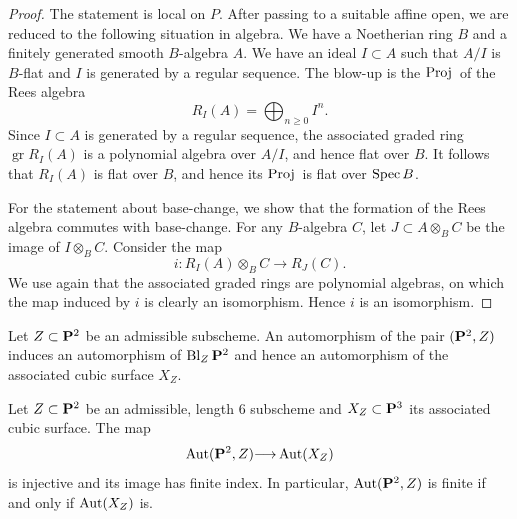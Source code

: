 \documentclass[12pt,reqno]{amsart}
\DeclareMathOperator{\Bl}{Bl}
\renewcommand{\to}{{\longrightarrow}}
\numberwithin{equation}{section}
\newcommand{\Proj}{{\text{\rm Proj}\,}}
\begin{document}
\begin{proof}
  The statement is local on $P$.
  After passing to a suitable affine open, we are reduced to the following situation in algebra.
  We have a Noetherian ring $B$ and a finitely generated smooth $B$-algebra $A$.
  We have an ideal $I \subset A$ such that $A/I$ is $B$-flat and $I$ is generated by a regular sequence.
  The blow-up is the $\Proj$ of the Rees algebra
  \[R_I(A) = \bigoplus_{n \geq 0}I^n.\]
  Since $I \subset A$ is generated by a regular sequence, the associated graded ring $\operatorname{gr} R_I(A)$ is a polynomial algebra over $A/I$, and hence flat over $B$.
  It follows that $R_I(A)$ is flat over $B$, and hence its $\Proj$ is flat over $\spec B$.
  
  For the statement about base-change, we show that the formation of the Rees algebra commutes with base-change.
  For any $B$-algebra $C$, let $J \subset A \otimes_B C$ be the image of $I \otimes_B C$.
  Consider the map
  \[ i \colon R_I(A) \otimes_B C \to R_J(C).\]
  We use again that the associated graded rings are polynomial algebras, on which the map induced by $i$ is clearly an isomorphism.
  Hence $i$ is an isomorphism.
\end{proof}


Let $Z \subset \P^2$ be an admissible subscheme.
An automorphism of the pair $(\P^2, Z)$ induces an automorphism of $\Bl_Z\P^2$ and hence an automorphism of the associated cubic surface $X_Z$.

\begin{proposition}
  \label{prop:good} Let $Z \subset \P^2$ be an admissible, length $6$
  subscheme and $X_Z \subset \P^3$ its associated cubic surface.
  The map
  \[ \Aut(\P^2, Z) \to \Aut(X_Z)\]
  is injective and its image has finite index.
  In particular, $\Aut(\P^2, Z)$ is finite if and only if $\Aut(X_Z)$ is.
\end{proposition}
\end{document}
